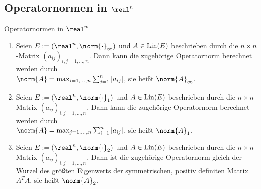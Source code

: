 \subsection{%
    Operatornormen in \texorpdfstring{$\real^n$}{ℝⁿ}%
}

\begin{Satz}{Operatornormen in $\real^n$}
    \begin{enumerate}
        \item
        Seien $E := (\real^n, \norm{\cdot}_\infty)$ und $A \in \operatorname{Lin}(E)$
        beschrieben durch die $n \times n$-Matrix $(a_{ij})_{i,j=1,\dotsc,n}$.
        Dann kann die zugehörige Operatornorm berechnet werden durch\\
        $\norm{A} = \max_{i=1,\dotsc,n} \sum_{j=1}^n |a_{ij}|$,
        sie heißt  $\norm{A}_\infty$.

        \item
        Seien $E := (\real^n, \norm{\cdot}_1)$ und $A \in \operatorname{Lin}(E)$
        beschrieben durch die $n \times n$-Matrix $(a_{ij})_{i,j=1,\dotsc,n}$.
        Dann kann die zugehörige Operatornorm berechnet werden durch\\
        $\norm{A} = \max_{j=1,\dotsc,n} \sum_{i=1}^n |a_{ij}|$,
        sie heißt  $\norm{A}_1$.

        \item
        Seien $E := (\real^n, \norm{\cdot}_2)$ und $A \in \operatorname{Lin}(E)$
        beschrieben durch die $n \times n$-Matrix $(a_{ij})_{i,j=1,\dotsc,n}$.
        Dann ist die zugehörige Operatornorm gleich der Wurzel des größten Eigenwerts
        der symmetrischen, positiv definiten Matrix $A^T A$,
        sie heißt  $\norm{A}_2$.
    \end{enumerate}
\end{Satz}

\pagebreak
